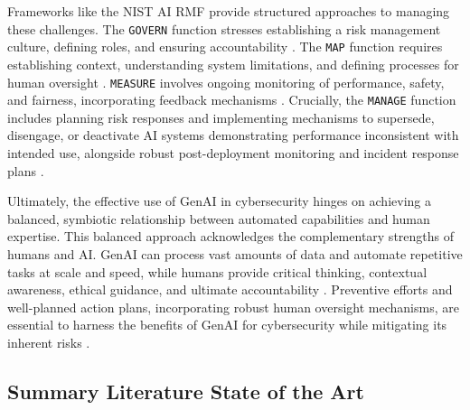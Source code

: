 Frameworks like the NIST AI RMF provide structured approaches to managing these challenges. The \texttt{GOVERN} function stresses establishing a risk management culture, defining roles, and ensuring accountability \cite[p. 21-24]{tabassi_artificial_2023}. The \texttt{MAP} function requires establishing context, understanding system limitations, and defining processes for human oversight \cite[p. 24-28]{tabassi_artificial_2023}. \texttt{MEASURE} involves ongoing monitoring of performance, safety, and fairness, incorporating feedback mechanisms \cite[p. 28-31]{tabassi_artificial_2023}. Crucially, the \texttt{MANAGE} function includes planning risk responses and implementing mechanisms to supersede, disengage, or deactivate AI systems demonstrating performance inconsistent with intended use, alongside robust post-deployment monitoring and incident response plans \cite[p. 31-33]{tabassi_artificial_2023}.

Ultimately, the effective use of GenAI in cybersecurity hinges on achieving a balanced, symbiotic relationship between automated capabilities and human expertise. This balanced approach acknowledges the complementary strengths of humans and AI. GenAI can process vast amounts of data and automate repetitive tasks at scale and speed, while humans provide critical thinking, contextual awareness, ethical guidance, and ultimate accountability \cite{patel_generative_2025}. Preventive efforts and well-planned action plans, incorporating robust human oversight mechanisms, are essential to harness the benefits of GenAI for cybersecurity while mitigating its inherent risks \cite{patel_generative_2025}.


\subsection{Summary Literature State of the Art} %
\label{sec:Summary Literature State of the Art}

